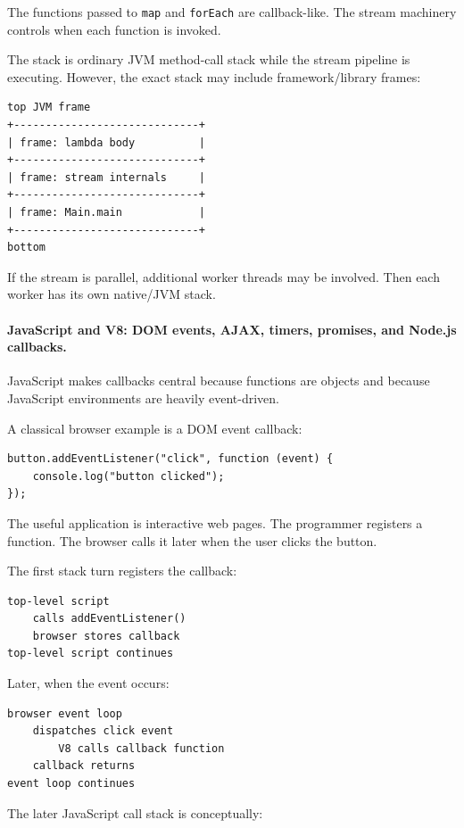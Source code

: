 The functions passed to \texttt{map} and \texttt{forEach} are callback-like. The stream machinery controls when each function is invoked.

The stack is ordinary JVM method-call stack while the stream pipeline is executing. However, the exact stack may include framework/library frames:

\begin{verbatim}
top JVM frame
+-----------------------------+
| frame: lambda body          |
+-----------------------------+
| frame: stream internals     |
+-----------------------------+
| frame: Main.main            |
+-----------------------------+
bottom
\end{verbatim}

If the stream is parallel, additional worker threads may be involved. Then each worker has its own native/JVM stack.

\paragraph{JavaScript and V8: DOM events, AJAX, timers, promises, and Node.js callbacks.}

JavaScript makes callbacks central because functions are objects and because JavaScript environments are heavily event-driven.

A classical browser example is a DOM event callback:

\begin{verbatim}
button.addEventListener("click", function (event) {
    console.log("button clicked");
});
\end{verbatim}

The useful application is interactive web pages. The programmer registers a function. The browser calls it later when the user clicks the button.

The first stack turn registers the callback:

\begin{verbatim}
top-level script
    calls addEventListener()
    browser stores callback
top-level script continues
\end{verbatim}

Later, when the event occurs:

\begin{verbatim}
browser event loop
    dispatches click event
        V8 calls callback function
    callback returns
event loop continues
\end{verbatim}

The later JavaScript call stack is conceptually:

